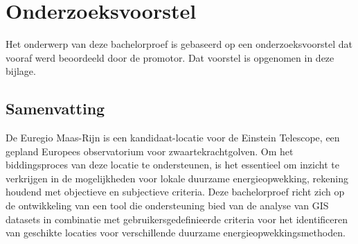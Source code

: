 \documentclass[dutch,dit,thesis]{hogentreport}
\begin{document}










%
%




\appendix

\chapter{Onderzoeksvoorstel}

Het onderwerp van deze bachelorproef is gebaseerd op een onderzoeksvoorstel dat vooraf werd beoordeeld door de promotor. Dat voorstel is opgenomen in deze bijlage.

\section*{Samenvatting}

De Euregio Maas-Rijn is een kandidaat-locatie voor de Einstein Telescope, een gepland Europees observatorium voor zwaartekrachtgolven. Om het biddingsproces van deze locatie te ondersteunen, is het essentieel om inzicht te verkrijgen in de mogelijkheden voor lokale duurzame energieopwekking,  rekening houdend met objectieve en subjectieve criteria. Deze bachelorproef richt zich op de ontwikkeling van een tool die ondersteuning bied van de analyse van GIS datasets in combinatie met gebruikersgedefinieerde criteria voor het identificeren van geschikte locaties voor verschillende duurzame energieopwekkingsmethoden.


\end{document}
